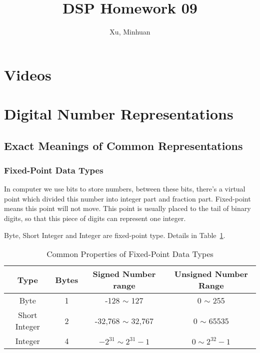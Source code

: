 \documentclass{article}
\begin{document}
\title{DSP Homework 09}
\author{Xu, Minhuan}
\maketitle
\tableofcontents
\begin{abstract}

\end{abstract}

\section{Videos}

\section{Digital Number Representations}

\subsection{Exact Meanings of Common Representations}

\subsubsection{Fixed-Point Data Types}
In computer we use bits to store numbers, between these bits, there's a virtual point which divided this number into integer part and fraction part. Fixed-point means this point will not move. This point is usually placed to the tail of binary digits, so that this piece of digits can represent one integer.

Byte, Short Integer and Integer are fixed-point type. Details in Table~\ref{tab:fixed-point}.

\begin{table}[!ht]
    \centering
    \begin{tabular}{|c|c|c|c|}
    \hline
        Type & Bytes & Signed Number range & Unsigned Number Range \\ \hline
        Byte & 1 & -128 $\sim$ 127 & 0 $\sim$ 255 \\ \hline
        Short Integer & 2 & -32,768 $\sim$ 32,767 & 0 $\sim$ 65535 \\ \hline
        Integer & 4 & $- 2^{31} \sim 2^{31} - 1$ & $0 \sim 2^{32} - 1$ \\ \hline
    \end{tabular}
    \caption{Common Properties of Fixed-Point Data Types}
    \label{tab:fixed-point}
\end{table}
\end{document}
